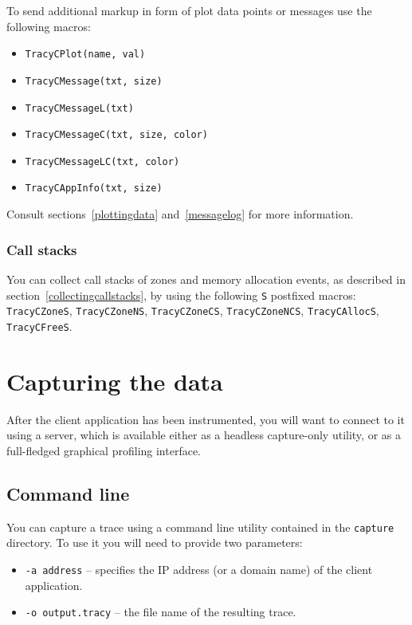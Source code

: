 \documentclass[hidelinks,titlepage,a4paper]{article}
\begin{document}
To send additional markup in form of plot data points or messages use the following macros:

\begin{itemize}
\item \texttt{TracyCPlot(name, val)}
\item \texttt{TracyCMessage(txt, size)}
\item \texttt{TracyCMessageL(txt)}
\item \texttt{TracyCMessageC(txt, size, color)}
\item \texttt{TracyCMessageLC(txt, color)}
\item \texttt{TracyCAppInfo(txt, size)}
\end{itemize}

Consult sections~\ref{plottingdata} and~\ref{messagelog} for more information.

\subsubsection{Call stacks}

You can collect call stacks of zones and memory allocation events, as described in section~\ref{collectingcallstacks}, by using the following \texttt{S} postfixed macros: \texttt{TracyCZoneS}, \texttt{TracyCZoneNS}, \texttt{TracyCZoneCS}, \texttt{TracyCZoneNCS}, \texttt{TracyCAllocS}, \texttt{TracyCFreeS}.

\section{Capturing the data}
\label{capturing}

After the client application has been instrumented, you will want to connect to it using a server, which is available either as a headless capture-only utility, or as a full-fledged graphical profiling interface.

\subsection{Command line}

You can capture a trace using a command line utility contained in the \texttt{capture} directory. To use it you will need to provide two parameters:

\begin{itemize}
\item \texttt{-a address} -- specifies the IP address (or a domain name) of the client application.
\item \texttt{-o output.tracy} -- the file name of the resulting trace.
\end{itemize}
\end{document}
